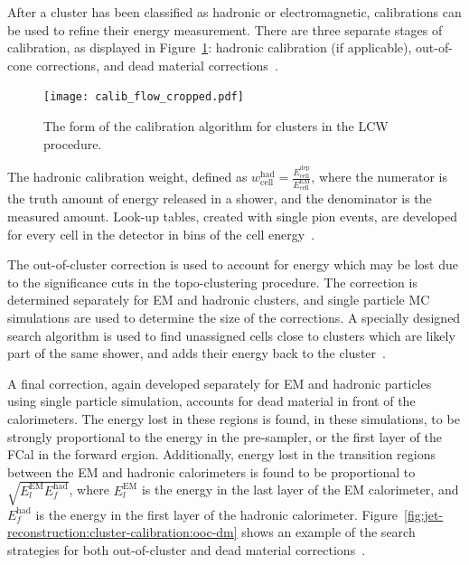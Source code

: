 
After a cluster has been classified as hadronic or electromagnetic,  calibrations can be used to refine their energy measurement. There are three separate stages of calibration, as displayed in Figure~\ref{fig:jet-reconstruction:cluster-calibration:calib-flow}: hadronic calibration (if applicable), out-of-cone corrections, and dead material corrections~\cite{Loch:1967028}.


\begin{figure}
\centering
\texttt{[image: calib\_flow\_cropped.pdf]}
\caption{The form of the calibration algorithm for clusters in the LCW procedure.}
\label{fig:jet-reconstruction:cluster-calibration:calib-flow}
\end{figure}


The hadronic calibration weight, defined as $w_\mathrm{cell}^\mathrm{had} = \frac{{E}^\mathrm{dep}_\mathrm{cell}}{E^\mathrm{EM}_\mathrm{cell}}$, where the numerator is the truth amount of energy released in a shower, and the denominator is the measured amount. Look-up tables, created with single pion events, are developed for every cell in the detector in bins of the cell energy~\cite{Loch:1967028}.

The out-of-cluster correction is used to account for energy which may be lost due to the significance cuts in the topo-clustering procedure. The correction is determined separately for EM and hadronic clusters, and single particle MC simulations are used to determine the size of the corrections. A specially designed search algorithm is used to find unassigned cells close to clusters which are likely part of the same shower, and adds their energy back to the cluster~\cite{Loch:1967028}.

A final correction, again developed separately for EM and hadronic particles using single particle simulation, accounts for dead material in front of the calorimeters. The energy lost in these regions is found, in these simulations, to be strongly proportional to the energy in the pre-sampler, or the first layer of the FCal in the forward ergion. Additionally, energy lost in the transition regions between the EM and hadronic calorimeters is found to be proportional to $\sqrt{E_l^\mathrm{EM} E_f^\mathrm{had}}$, where $E_l^\mathrm{EM}$ is the energy in the last layer of the EM calorimeter, and $E_f^\mathrm{had}$ is the energy in the first layer of the hadronic calorimeter. Figure~\ref{fig:jet-reconstruction:cluster-calibration:ooc-dm} shows an example of the search strategies for both out-of-cluster and dead material corrections~\cite{Loch:1967028}. 


